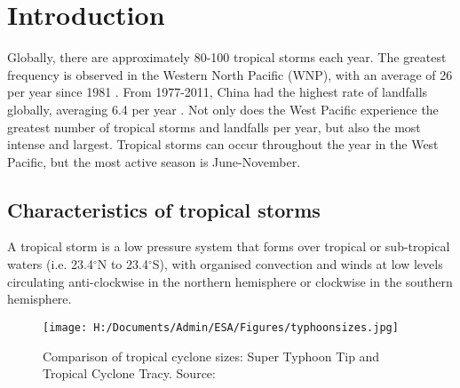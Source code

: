 
\chapter{Introduction}  %

Globally, there are approximately 80-100 tropical storms each year. The greatest frequency is observed in the Western North Pacific (WNP), with an average of 26 per year since 1981 \citep{zhan2012seasonal}. From 1977-2011, China had the highest rate of landfalls globally, averaging 6.4 per year \citep{HironoriFudeyasu:178}. Not only does the West Pacific experience the greatest number of tropical storms and landfalls per year, but also the most intense and largest. Tropical storms can occur throughout the year in the West Pacific, but the most active season is June-November.


\section{Characteristics of tropical storms}

A tropical storm is a low pressure system that forms over tropical or sub-tropical waters (i.e. 23.4$^{\circ}$N to  23.4$^{\circ}$S), with organised convection and winds at low levels circulating anti-clockwise in the northern hemisphere or clockwise in the southern hemisphere. 

\begin{figure}[h]
	\centering
	\noindent\texttt{[image: H:/Documents/Admin/ESA/Figures/typhoonsizes.jpg]}
	\caption{Comparison of tropical cyclone sizes: Super Typhoon Tip and Tropical Cyclone Tracy. Source: \cite{noaa_structure}}\label{fig:cyclone_size}
\end{figure}

